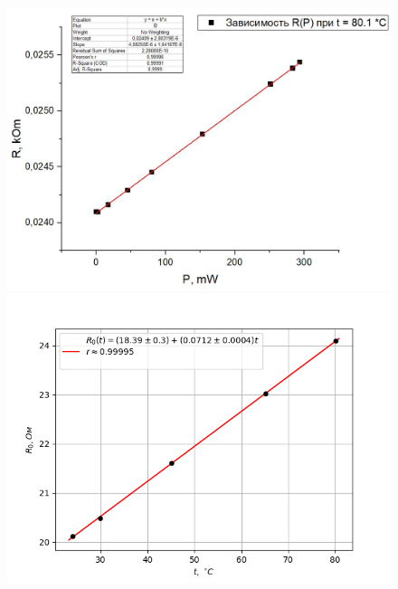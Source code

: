 \documentclass[a4paper,12pt]{article} %
\begin{document}
\begin{figure}
\begin{minipage}{\linewidth}
\centering
\includegraphics[scale=0.35]{80.1.jpg}
\caption{}
\end{minipage}
\begin{minipage}{\linewidth}
\centering
\includegraphics[scale=1]{R0t.png}
\caption{}
\end{minipage}
\end{figure}
\end{document}
